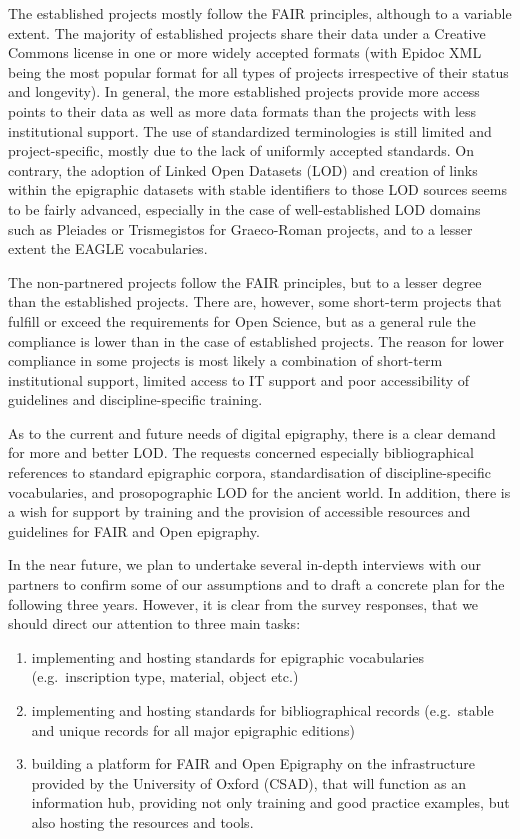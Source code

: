 \documentclass[
  12pt,
]{scrreprt}
\providecommand{\tightlist}{%
  \setlength{\itemsep}{0pt}\setlength{\parskip}{0pt}}
\begin{document}
The established projects mostly follow the FAIR principles, although to
a variable extent. The majority of established projects share their data
under a Creative Commons license in one or more widely accepted formats
(with Epidoc XML being the most popular format for all types of projects
irrespective of their status and longevity). In general, the more
established projects provide more access points to their data as well as
more data formats than the projects with less institutional support. The
use of standardized terminologies is still limited and project-specific,
mostly due to the lack of uniformly accepted standards. On contrary, the
adoption of Linked Open Datasets (LOD) and creation of links within the
epigraphic datasets with stable identifiers to those LOD sources seems
to be fairly advanced, especially in the case of well-established LOD
domains such as Pleiades or Trismegistos for Graeco-Roman projects, and
to a lesser extent the EAGLE vocabularies.

The non-partnered projects follow the FAIR principles, but to a lesser
degree than the established projects. There are, however, some
short-term projects that fulfill or exceed the requirements for Open
Science, but as a general rule the compliance is lower than in the case
of established projects. The reason for lower compliance in some
projects is most likely a combination of short-term institutional
support, limited access to IT support and poor accessibility of
guidelines and discipline-specific training.

As to the current and future needs of digital epigraphy, there is a
clear demand for more and better LOD. The requests concerned especially
bibliographical references to standard epigraphic corpora,
standardisation of discipline-specific vocabularies, and prosopographic
LOD for the ancient world. In addition, there is a wish for support by
training and the provision of accessible resources and guidelines for
FAIR and Open epigraphy.

In the near future, we plan to undertake several in-depth interviews
with our partners to confirm some of our assumptions and to draft a
concrete plan for the following three years. However, it is clear from
the survey responses, that we should direct our attention to three main
tasks:

\begin{enumerate}
\def\labelenumi{\arabic{enumi}.}
\tightlist
\item
  implementing and hosting standards for epigraphic vocabularies
  (e.g.~inscription type, material, object etc.)
\item
  implementing and hosting standards for bibliographical records
  (e.g.~stable and unique records for all major epigraphic editions)
\item
  building a platform for FAIR and Open Epigraphy on the infrastructure
  provided by the University of Oxford (CSAD), that will function as an
  information hub, providing not only training and good practice
  examples, but also hosting the resources and tools.
\end{enumerate}
\end{document}
